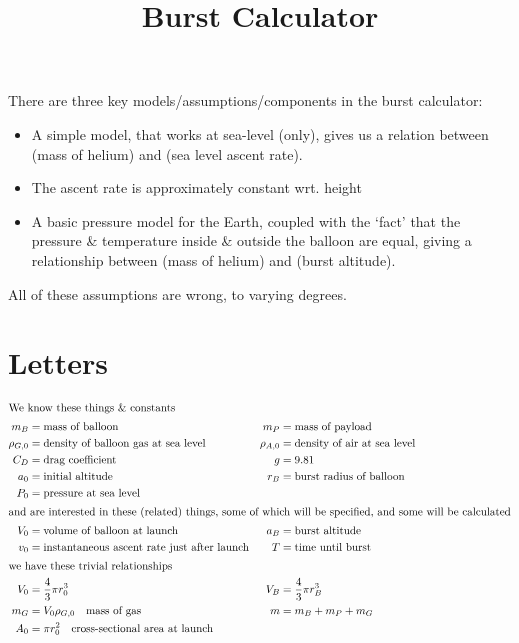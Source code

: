 \documentclass{article}
\begin{document}
\title{Burst Calculator}

There are three key models/assumptions/components in the burst calculator:

\begin{itemize}
    \item A simple model, that works at sea-level (only), gives us a
          relation between (mass of helium) and (sea level ascent rate).
    \item The ascent rate is approximately constant wrt. height
    \item A basic pressure model for the Earth, coupled with the `fact'
          that the pressure \& temperature inside \& outside the balloon are
          equal, giving a relationship between (mass of helium) and (burst altitude).
\end{itemize}

All of these assumptions are wrong, to varying degrees.

\setcounter{section}{-1}
\section{Letters}

\begin{align*}
\intertext{We know these things \& constants}
    m_B &= \text{mass of balloon} &
    m_P &= \text{mass of payload} \\
    \rho_{G,0} &= \text{density of balloon gas at sea level} &
    \rho_{A,0} &= \text{density of air at sea level } \\
    C_D &= \text{drag coefficient} &
    g &= 9.81 \\
    a_0 &= \text{initial altitude} &
    r_B &= \text{burst radius of balloon} \\
    P_0 &= \text{pressure at sea level} \\
%
\intertext{and are interested in these (related) things, some of which
           will be specified, and some will be calculated}
    V_0 &= \text{volume of balloon at launch} &
    a_B &= \text{burst altitude} \\
    v_0 &= \text{instantaneous ascent rate just after launch} &
    T &= \text{time until burst} \\
%
\intertext{we have these trivial relationships}
    V_0 &= \frac{4}{3} \pi r_0^3 &
    V_B &= \frac{4}{3} \pi r_B^3 \\
    m_G &= V_0 \rho_{G,0} \quad \text{mass of gas} &
    m &= m_B + m_P + m_G \\
    A_0 &= \pi r_0^2 \quad \text{cross-sectional area at launch} \\
%
\end{align*}
\end{document}
